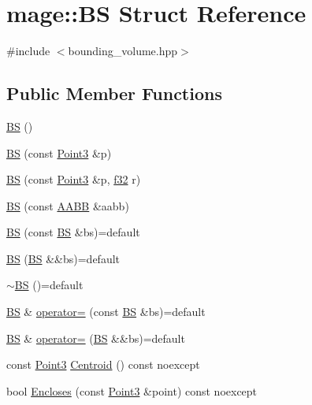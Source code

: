 \hypertarget{structmage_1_1_b_s}{}\section{mage\+:\+:BS Struct Reference}
\label{structmage_1_1_b_s}


{\ttfamily \#include $<$bounding\+\_\+volume.\+hpp$>$}

\subsection*{Public Member Functions}
\begin{DoxyCompactItemize}
\item 
\hyperlink{structmage_1_1_b_s_aa34921d9ea23b9a724ddf739b3adabfa}{BS} ()
\item 
\hyperlink{structmage_1_1_b_s_ae64c575576180fb6409125c8792c2d29}{BS} (const \hyperlink{structmage_1_1_point3}{Point3} \&p)
\item 
\hyperlink{structmage_1_1_b_s_a07d1e878d111eb99404d7dc062d01dd9}{BS} (const \hyperlink{structmage_1_1_point3}{Point3} \&p, \hyperlink{namespacemage_a6a44ad388483959dc4dff9f2aef91431}{f32} r)
\item 
\hyperlink{structmage_1_1_b_s_adb709aad7bd4b6816ae59ec87221bd6a}{BS} (const \hyperlink{structmage_1_1_a_a_b_b}{A\+A\+BB} \&aabb)
\item 
\hyperlink{structmage_1_1_b_s_a01cf5aaeae2a87c56527a338889f5079}{BS} (const \hyperlink{structmage_1_1_b_s}{BS} \&bs)=default
\item 
\hyperlink{structmage_1_1_b_s_a8974a41ba4a204e1b7ad5a218f9629e8}{BS} (\hyperlink{structmage_1_1_b_s}{BS} \&\&bs)=default
\item 
\hyperlink{structmage_1_1_b_s_a111f60f8ab53c7497ff7aaa743619829}{$\sim$\+BS} ()=default
\item 
\hyperlink{structmage_1_1_b_s}{BS} \& \hyperlink{structmage_1_1_b_s_aef60d898cb44bbf1e3988351b5717faa}{operator=} (const \hyperlink{structmage_1_1_b_s}{BS} \&bs)=default
\item 
\hyperlink{structmage_1_1_b_s}{BS} \& \hyperlink{structmage_1_1_b_s_a751360f4d52fe40f6f07f29a759c9f0c}{operator=} (\hyperlink{structmage_1_1_b_s}{BS} \&\&bs)=default
\item 
const \hyperlink{structmage_1_1_point3}{Point3} \hyperlink{structmage_1_1_b_s_a18f360e81ee3acd3bad8d23bed4326e5}{Centroid} () const noexcept
\item 
bool \hyperlink{structmage_1_1_b_s_a0050f2e110b107ae98bb9f33e3386758}{Encloses} (const \hyperlink{structmage_1_1_point3}{Point3} \&point) const noexcept

\end{DoxyCompactItemize}
